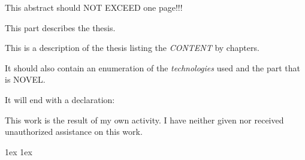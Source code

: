 \documentclass[final]{ubb_dolgozat}
\author{%
Kátay Csilla
}
\begin{document}
\begin{abstractEN} %



{ \color{gray!60!red}
	This abstract should NOT EXCEED one page!!!
	
	This part describes the thesis.

	This is a description of the thesis listing the {\em CONTENT} by chapters.

	It should also contain an enumeration of the {\em technologies} used and the part that is NOVEL.

	\vfill
  
	
	\vfill

	It will end with a declaration:
}

This work is the result of my own activity. I have neither given nor received unauthorized assistance on this work.

\end{abstractEN}

\maketitle


{ \baselineskip 1ex
  \parskip 1ex
  \tableofcontents
}










%

%

%


\appendix
%


{ \renewcommand{\baselinestretch}{0.8}\normalsize %
  \setlength{\itemsep}{-2.4mm}
  \setlength{\bibspacing}{0.67\baselineskip}
  
  
}
\end{document}
